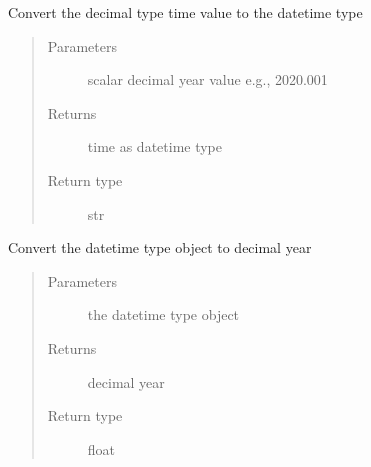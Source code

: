 \documentclass[letterpaper,10pt,english]{sphinxmanual}
\begin{document}

\begin{fulllineitems}
\label{\detokenize{modules/analysis_support:dtwhaclustering.analysis_support.dec2dt_scalar}}
\sphinxAtStartPar
Convert the decimal type time value to the date\sphinxhyphen{}time type
\begin{quote}\begin{description}
\item[{Parameters}] \leavevmode
\sphinxAtStartPar
{} \textendash{} scalar decimal year value e.g., 2020.001

\item[{Returns}] \leavevmode
\sphinxAtStartPar
time as datetime type

\item[{Return type}] \leavevmode
\sphinxAtStartPar
str

\end{description}\end{quote}

\end{fulllineitems}


\begin{fulllineitems}
\label{\detokenize{modules/analysis_support:dtwhaclustering.analysis_support.toYearFraction}}
\sphinxAtStartPar
Convert the date\sphinxhyphen{}time type object to decimal year
\begin{quote}\begin{description}
\item[{Parameters}] \leavevmode
\sphinxAtStartPar
{} \textendash{} the date\sphinxhyphen{}time type object

\item[{Returns}] \leavevmode
\sphinxAtStartPar
decimal year

\item[{Return type}] \leavevmode
\sphinxAtStartPar
float

\end{description}\end{quote}

\end{fulllineitems}
\end{document}
